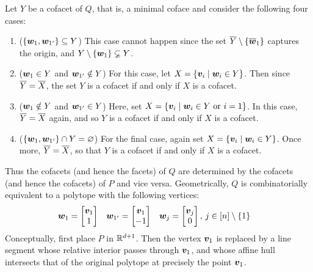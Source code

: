         Let \(Y\) be a cofacet of \(Q\), that is, a minimal coface and consider the following four cases:
            \begin{enumerate}
                \item   (\(\left\{\bm{w}_1,\bm{w}_{1'}\right\}\subseteq Y\))  This case cannot happen since the set \(\overline{Y}\setminus\left\{\overline{\bm{w}}_1\right\}\) captures the origin, and \(Y\setminus\left\{\bm{w}_1\right\}\varsubsetneq Y\).
                \item   (\(\bm{w}_1\in Y\) and \(\bm{w}_{1'}\notin Y\))  For this case, let \(X=\setb{\ve v_i}{\ve w_i\in Y}\).  Then since \(\overline{Y}=\overline{X}\), the set \(Y\) is a cofacet if and only if \(X\) is a cofacet.
                \item   (\(\bm{w}_1\notin Y\) and \(\bm{w}_{1'}\in Y\))  Here, set \(X=\setb{\ve v_i}{\ve w_i\in Y\text{ or }i=1}\).  In this case, \(\overline{Y}=\overline{X}\) again, and so \(Y\) is a cofacet if and only if \(X\) is a cofacet.
                \item   (\(\left\{\bm{w}_1,\bm{w}_{1'}\right\}\cap Y=\varnothing\)) For the final case, again set \(X=\setb{\ve v_i}{\ve w_i\in Y}\).  Once more, \(\overline{Y}=\overline{X}\), so that \(Y\) is a cofacet if and only if \(X\) is a cofacet.
            \end{enumerate}
        Thus the cofacets (and hence the facets) of \(Q\) are determined by the cofacets (and hence the cofacets) of \(P\) and vice versa. Geometrically, \(Q\) is combinatorially equivalent to a polytope with the following vertices:
            \begin{align*}
                \bm{w}_1
                    &=   \begin{bmatrix}\bm{v}_1\\1 \end{bmatrix}&
                \bm{w}_{1'}
                    &=   \begin{bmatrix}\bm{v}_1\\-1 \end{bmatrix}&
                \bm{w}_j
                    &=   \begin{bmatrix}\bm{v}_j\\0 \end{bmatrix},\,j\in\left[n\right]\setminus\left\{1\right\}
            \end{align*}
        Conceptually, first place \(P\) in \(\mathbb{R}^{d+1}\).  Then the vertex \(\bm{v}_1\) is replaced by a line segment whose relative interior passes through \(\bm{v}_1\), and whose affine hull intersects that of the original polytope at precisely the point \(\bm{v}_1\).

